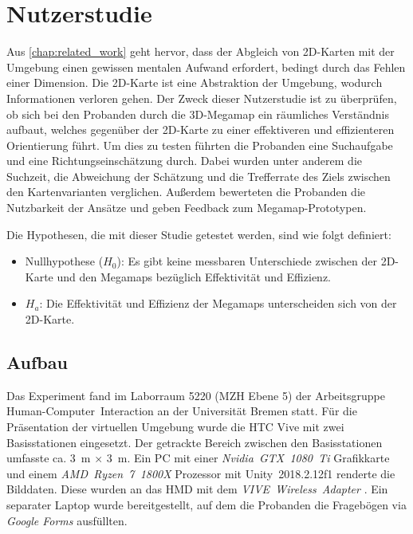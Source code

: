 \chapter{Nutzerstudie}
\label{chap:evaluation}
Aus \autoref{chap:related_work} geht hervor, dass der Abgleich von 2D-Karten mit der Umgebung einen gewissen mentalen Aufwand erfordert, bedingt durch das Fehlen einer Dimension.
Die 2D-Karte ist eine Abstraktion der Umgebung, wodurch Informationen verloren gehen.
Der Zweck dieser Nutzerstudie ist zu überprüfen, ob sich bei den Probanden durch die 3D-Megamap ein räumliches Verständnis aufbaut, welches gegenüber der 2D-Karte zu einer effektiveren und effizienteren Orientierung führt.
Um dies zu testen führten die Probanden eine Suchaufgabe und eine Richtungseinschätzung durch.
Dabei wurden unter anderem die Suchzeit, die Abweichung der Schätzung und die Trefferrate des Ziels zwischen den Kartenvarianten verglichen.
Außerdem bewerteten die Probanden die Nutzbarkeit der Ansätze und geben Feedback zum Megamap-Prototypen.

Die Hypothesen, die mit dieser Studie getestet werden, sind wie folgt definiert:
\begin{itemize}
    \item Nullhypothese ($H_0$): Es gibt keine messbaren Unterschiede zwischen der 2D-Karte und den Megamaps bezüglich Effektivität und Effizienz.
    \item $H_a$: Die Effektivität und Effizienz der Megamaps unterscheiden sich von der 2D-Karte.
\end{itemize}

\section{Aufbau}
Das Experiment fand im Laborraum 5220 (MZH Ebene 5) der Arbeitsgruppe Human-Com\-pu\-ter~Inter\-action an der Universität Bremen statt.
Für die Präsentation der virtuellen Umgebung wurde die HTC Vive mit zwei Basisstationen eingesetzt.
Der getrackte Bereich zwischen den Basisstationen umfasste ca. \SI{3}{\metre} $\times$ \SI{3}{\metre}.
Ein PC mit einer \emph{Nvidia~GTX~1080~Ti} Grafikkarte und einem \emph{AMD~Ryzen~7~1800X} Prozessor mit Unity~2018.2.12f1 renderte die Bilddaten.
Diese wurden an das HMD mit dem \emph{VIVE~Wireless~Adapter} \parencite{HTCCorporation2018b}.
Ein separater Laptop wurde bereitgestellt, auf dem die Probanden die Fragebögen via \emph{Google Forms} ausfüllten.

